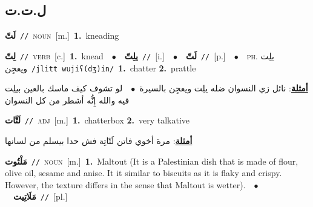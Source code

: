 \documentclass[10pt,a4paper,twoside]{article} %
\begin{document}
\begin{multicols}{2}
{{{{{{{{{{{{{\vspace{-3mm}
\subsection*{\color{blue}\foreignlanguage{arabic}{ل.ت.ت}\color{blue}{}} 

{\setlength\topsep{0pt}\textbf{\foreignlanguage{arabic}{لَتّ}}\ {\color{gray}\texttt{//}\color{black}}\ \textsc{noun}\ [m.]\ \textbf{1.}~kneading\ 

{\setlength\topsep{0pt}\textbf{\foreignlanguage{arabic}{لِتّ}}\ {\color{gray}\texttt{//}\color{black}}\ \textsc{verb}\ [c.]\ \textbf{1.}~knead\ \ $\bullet$\ \ \setlength\topsep{0pt}\textbf{\foreignlanguage{arabic}{يلِتّ}}\ {\color{gray}\texttt{//}\color{black}}\ [i.]\ \ $\bullet$\ \ \setlength\topsep{0pt}\textbf{\foreignlanguage{arabic}{لَتّ}}\ {\color{gray}\texttt{//}\color{black}}\ [p.]\ \ $\bullet$\ \ \textsc{ph.} \color{gray} \foreignlanguage{arabic}{يلِت ويعجِن}\color{black}\ {\color{gray}\texttt{/{\sffamily jlitt wujiʕ(dʒ)in}/}\color{black}}\ \textbf{1.}~chatter  \textbf{2.}~prattle\  \begin{flushright}\color{gray}\foreignlanguage{arabic}{\textbf{\underline{\foreignlanguage{arabic}{أمثلة}}}: نائل زي النسوان ضله يلِت ويعجِن بالسيرة\ $\bullet$\ \  لو تشوف كيف ماسك بالعين بيلِت فيه والله إِنُّه أشطر من كل النسوان}\end{flushright}\color{black}} \vspace{2mm}

{\setlength\topsep{0pt}\textbf{\foreignlanguage{arabic}{لَتَّات}}\ {\color{gray}\texttt{//}\color{black}}\ \textsc{adj}\ [m.]\ \textbf{1.}~chatterbox  \textbf{2.}~very talkative\  \begin{flushright}\color{gray}\foreignlanguage{arabic}{\textbf{\underline{\foreignlanguage{arabic}{أمثلة}}}: مرة أخوي فاتن لَتّاتِة فش حدا بيسلم من لسانها}\end{flushright}\color{black}} \vspace{2mm}

{\setlength\topsep{0pt}\textbf{\foreignlanguage{arabic}{مَلْتُوت}}\ {\color{gray}\texttt{//}\color{black}}\ \textsc{noun}\ [m.]\ \textbf{1.}~Maltout (It is a Palestinian dish that is made of flour, olive oil, sesame and anise. It it similar to biscuits as it is flaky and crispy. However, the texture differs in the sense that Maltout is wetter).\ \ $\bullet$\ \ \setlength\topsep{0pt}\textbf{\foreignlanguage{arabic}{مَلَاتِيت}}\ {\color{gray}\texttt{//}\color{black}}\ [pl.]\ 

}}}}}}}}}}}}}}}
\end{multicols}
\end{document}
